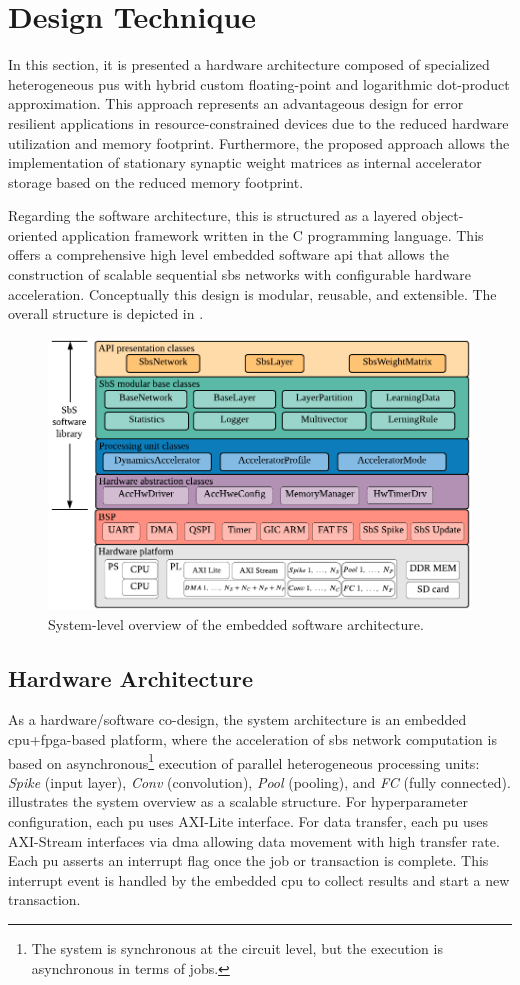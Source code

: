 \section{Design Technique}
\label{sec:system_design}

	In this section, it is presented a hardware architecture composed of specialized heterogeneous \glspl{pu} with hybrid custom floating-point and logarithmic dot-product approximation. This approach represents an advantageous design for error resilient applications in resource-constrained devices due to the reduced hardware utilization and memory footprint. Furthermore, the proposed approach allows the implementation of stationary synaptic weight matrices as internal accelerator storage based on the reduced memory footprint.
	

Regarding the software architecture, this is structured as a
layered object-oriented application framework written in the C programming language. This offers a comprehensive high level embedded software \gls{api} that allows the construction of scalable sequential \gls{sbs} networks with configurable hardware acceleration. Conceptually this design is modular, reusable, and extensible. The overall structure is depicted in .

\begin{figure}[b!]
	\centering
	\includegraphics[width=0.5\columnwidth]{./chapters/sbs_accelerator/figures/sbs_software_component.pdf}
	\caption{System-level overview of the embedded software architecture.}
	\label{fig:sbs_sw_stack}
\end{figure}

\subsection{Hardware Architecture} \label{Hardware_architecture}
As a hardware/software co-design, the system architecture is an embedded \gls{cpu}+\gls{fpga}-based platform, where the acceleration of \gls{sbs} network computation is based on asynchronous\footnote{The system is synchronous at the circuit level, but the execution is asynchronous in terms of jobs.} execution of parallel heterogeneous processing units: \emph{Spike} (input layer), \emph{Conv} (convolution), \emph{Pool} (pooling), and \emph{FC} (fully connected).  illustrates the system overview as a scalable structure. For hyperparameter configuration, each \gls{pu} uses AXI-Lite interface. For data transfer, each \gls{pu} uses AXI-Stream interfaces via \gls{dma} allowing data movement with high transfer rate. Each \gls{pu} asserts an interrupt flag once the job or transaction is complete. This interrupt event is handled by the embedded \gls{cpu} to collect results and start a new transaction.

